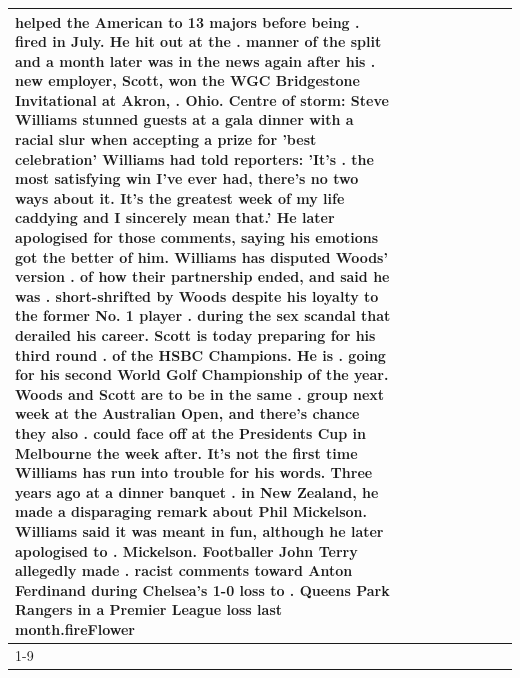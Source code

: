 \begin{table}[H]
\begin{tabular}{lllrlllll}
helped the American to 13 majors before being . fired in July. He hit out at the . manner of the split and a month later was in the news again after his . new employer, Scott, won the WGC Bridgestone Invitational at Akron, . Ohio. Centre of storm: Steve Williams stunned guests at a gala dinner with a racial slur when accepting a prize for 'best celebration' Williams had told reporters: 'It's . the most satisfying win I've ever had, there's no two ways about it. It's the greatest week of my life caddying and I sincerely mean that.' He later apologised for those comments, saying his emotions got the better of him. Williams has disputed Woods' version . of how their partnership ended, and said he was . short-shrifted by Woods despite his loyalty to the former No. 1 player . during the sex scandal that derailed his career. Scott is today preparing for his third round . of the HSBC Champions. He is . going for his second World Golf Championship of the year. Woods and Scott are to be in the same . group next week at the Australian Open, and there's chance they also . could face off at the Presidents Cup in Melbourne the week after. It's not the first time Williams has run into trouble for his words. Three years ago at a dinner banquet . in New Zealand, he made a disparaging remark about Phil Mickelson. Williams said it was meant in fun, although he later apologised to . Mickelson. Footballer John Terry allegedly made . racist comments toward Anton Ferdinand during Chelsea's 1-0 loss to . Queens Park Rangers in a Premier League loss last month.fireFlower \\
\cline{1-9}

\end{tabular}
\end{table}
